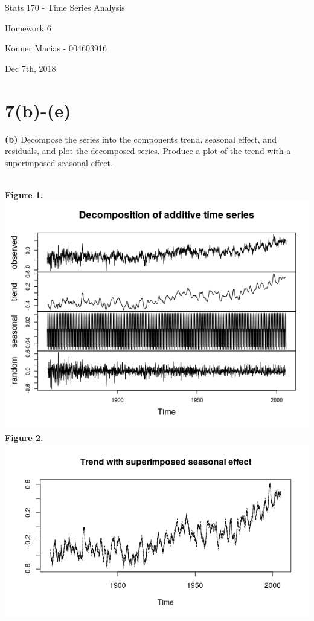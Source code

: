 \documentclass[11pt]{article}
\begin{document}
\centerline{\Large Stats 170 - Time Series Analysis}
\vspace{3pc}
\centerline{\Large Homework 6}
\vspace{.5pc}
\centerline{Konner Macias - 004603916}
\centerline{Dec 7th, 2018}
\vspace{1.5pc}
\section{7(b)-(e)}
\textbf{(b)} Decompose the series into the components trend, seasonal effect, and residuals, and plot the decomposed series. Produce a plot of the trend with a superimposed seasonal effect.
\\\\
\begin{center}
\textbf{Figure 1.} \\
\includegraphics[scale=1]{decom} \\
\textbf{Figure 2.} \\
\includegraphics[scale=1]{super}
\end{center}
\end{document}
